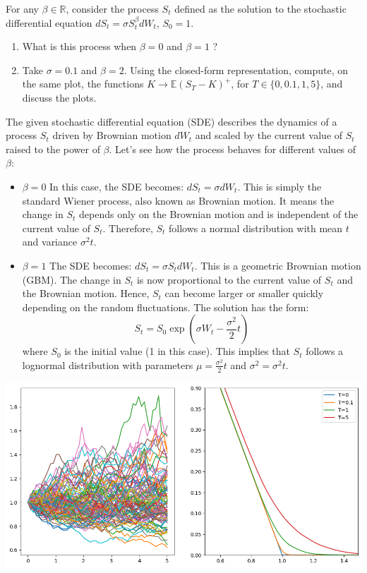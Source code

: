 \documentclass[12pt,a4paper]{exam}
\begin{document}
\begin{questions}
\begin{solution}
\begin{solution}
\begin{solution}
\end{solution}

\question For any $\beta\in\mathbb{R}$, consider the process $S_t$ defined as the solution to the stochastic differential equation $dS_t = \sigma S^\beta_t dW_t$, $S_0 = 1$.
\begin{enumerate}[label=(\alph*),font=\itshape]
\item What is this process when $\beta=0$ and $\beta = 1$ ?
\item Take $\sigma = 0.1$ and $\beta = 2$. Using the closed-form representation, compute, on the same plot, the functions $K\rightarrow \mathbb{E}(S_T - K)^+$, for $T\in\{0, 0.1, 1, 5\}$, and discuss the plots.
\end{enumerate}
\fillwithlines{3cm}

\begin{solution}
The given stochastic differential equation (SDE) describes the dynamics of a process $S_t$ driven by Brownian motion $dW_t$ and scaled by the current value of $S_t$ raised to the power of $\beta$. Let's see how the process behaves for different values of $\beta$:
\begin{itemize}
\item \textbf{$\beta=0$} In this case, the SDE becomes: $dS_t = \sigma dW_t$. This is simply the standard Wiener process, also known as Brownian motion. It means the change in $S_t$ depends only on the Brownian motion and is independent of the current value of $S_t$. Therefore, $S_t$ follows a normal distribution with mean $t$ and variance $\sigma^2 t$.
\item \textbf{$\beta=1$} The SDE becomes: $dS_t = \sigma S_t dW_t$. This is a geometric Brownian motion (GBM). The change in $S_t$ is now proportional to the current value of $S_t$ and the Brownian motion. Hence, $S_t$ can become larger or smaller quickly depending on the random fluctuations. The solution has the form:
\begin{equation*}
S_t = S_0 \exp\left(\sigma W_t - \frac{\sigma^2}{2}t\right) 
\end{equation*}
where $S_0$ is the initial value (1 in this case). This implies that $S_t$ follows a lognormal distribution with parameters $\mu=\frac{\sigma^2}{2}t$ and $\sigma^2 = \sigma^2 t$.
\end{itemize}
\begin{center}
	\includegraphics[width=0.8\linewidth]{addons/cev_sim}
\end{center}
\end{solution}


\end{solution}
\end{solution}
\end{questions}
\end{document}
